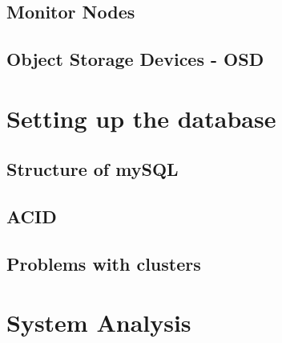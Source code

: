 \documentclass[titlepage, a4paper, 11pt]{scrartcl}
\begin{document}
        \subsection{Monitor Nodes}


        \subsection{Object Storage Devices - OSD}

        
    \section{Setting up the database}

        \subsection{Structure of mySQL}


        \subsection{ACID}




        \subsection{Problems with clusters}


    \section{System Analysis}
\end{document}
